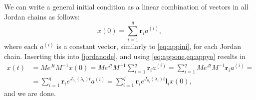 \documentclass[../main.tex]{subfiles}
\begin{document}
We can write a general initial condition as a linear combination of vectors in all Jordan chains as follows:
\begin{equation}
    x(0) = \sum_{i=1}^q \boldsymbol{r}_ia^{(i)},
\end{equation}
where each $a^{(i)}$ is a constant vector, similarly to \cref{eq:appini}, for each Jordan chain. Inserting this into \cref{jordanode}, and using \cref{eq:appone,eq:appyo} results in
\begin{equation}
    \begin{aligned}
        x(t) &= Me^{Jt}M^{-1}x(0) = Me^{Jt}M^{-1}\sum_{i=1}^q \boldsymbol{r}_ia^{(i)} = \sum_{i=1}^qMe^{Jt}M^{-1} \boldsymbol{r}_ia^{(i)} =\\&= \sum_{i=1}^q\boldsymbol{r}_ie^{J_{n_i}(\lambda_i)t}a^{(i)} = \sum_{i=1}^q\boldsymbol{r}_ie^{J_{n_i}(\lambda_i)t}\boldsymbol{l}_ix(0),
\end{aligned}
\end{equation}
and we are done.
\end{document}
